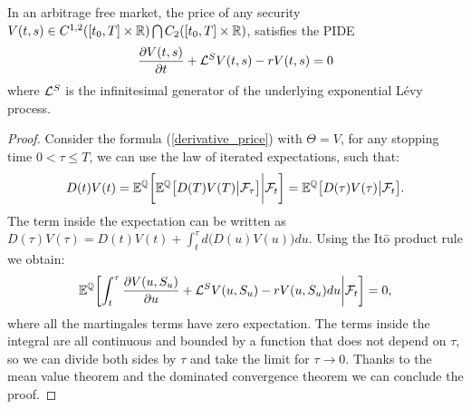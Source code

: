 \begin{Theorem}
 In an arbitrage free market, the price of any security $V(t,s) \in C^{1,2}([t_0,T] \times \mathbb{R}) \bigcap C_2([t_0,T] \times \mathbb{R}) $, satisfies the PIDE
\begin{equation}\label{derivative_PIDE}
 \frac{\partial V(t,s)}{\partial t} + \mathcal{L}^{S} V(t,s) -r V(t,s) = 0   
\end{equation}
where $\mathcal{L}^S$ is the infinitesimal generator of the underlying exponential Lévy process. 
\end{Theorem}
\begin{proof}
 Consider the formula (\ref{derivative_price}) with $\varTheta = V$, for any stopping time $0 < \tau \leq T$, we can use the law of iterated expectations, such that:
 $$ D(t) V(t) = \mathbb{E}^{\mathbb{Q}}  \biggl[ \mathbb{E}^{\mathbb{Q}} \bigl[ D(T) V(T) \big| \mathcal{F}_{\tau} \bigr] \bigg| \mathcal{F}_t \biggr] = \mathbb{E}^{\mathbb{Q}} \bigl[ D(\tau) V(\tau) \big| \mathcal{F}_t \bigr]. $$
 The term inside the expectation can be written as $D(\tau) V(\tau) = D(t) V(t) + \int_t^{\tau} d\bigl(D(u) V(u)\bigr) du$. Using the It\=o product rule we obtain:
 $$ \mathbb{E}^{\mathbb{Q}} \biggl[ \int_t^{\tau} \frac{\partial V(u,S_u)}{\partial u} + \mathcal{L}^{S} V(u,S_u) -r V(u,S_u) du \bigg| \mathcal{F}_t \biggr] = 0, $$
 where all the martingales terms have zero expectation. The terms inside the integral are all continuous and bounded by a function that does not depend on $\tau$, 
 so we can divide both sides by $\tau$ and take the limit for 
 $\tau \to 0$. Thanks to the mean value theorem and the dominated convergence theorem we can conclude the proof.
\end{proof}

